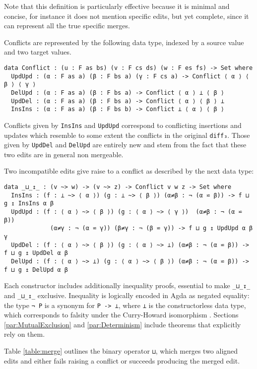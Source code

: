 \documentclass[../Thesis.tex]{subfiles}
\begin{document}
	Note that this definition is particularly effective because it is 
	minimal and concise, for instance it does not mention specific
	edits, but yet complete, since it can represent all the true specific merges.

	Conflicts are represented by the following data type, indexed by 
	a source value and two target values.

\begin{verbatim}	
data Conflict : (u : F as bs) (v : F cs ds) (w : F es fs) -> Set where
  UpdUpd : (α : F as a) (β : F bs a) (γ : F cs a) -> Conflict ⟨ α ⟩ ⟨ β ⟩ ⟨ γ ⟩
  DelUpd : (α : F as a) (β : F bs a) -> Conflict ⟨ α ⟩ ⊥ ⟨ β ⟩
  UpdDel : (α : F as a) (β : F bs a) -> Conflict ⟨ α ⟩ ⟨ β ⟩ ⊥ 
  InsIns : (α : F as a) (β : F bs b) -> Conflict ⊥ ⟨ α ⟩ ⟨ β ⟩
\end{verbatim}
	
	Conflicts given by \texttt{InsIns} and \texttt{UpdUpd}	 correspond to 
	conflicting insertions and updates which resemble to some extent the
	conflicts in the original \texttt{diff₃}. Those given by \texttt{UpdDel} and 
	\texttt{DelUpd} are entirely new and stem from the fact that these two
	edits are in general non mergeable.
	
	Two incompatible edits give raise to a conflict as described by the
	next data type:
	
\begin{verbatim}
data _⊔_↥_ : (v ~> w) -> (v ~> z) -> Conflict v w z -> Set where
  InsIns : (f : ⊥ ~> ⟨ α ⟩) (g : ⊥ ~> ⟨ β ⟩) (α≠β : ¬ (α ⋍ β)) -> f ⊔ g ↥ InsIns α β
  UpdUpd : (f : ⟨ α ⟩ ~> ⟨ β ⟩) (g : ⟨ α ⟩ ~> ⟨ γ ⟩)  (α≠β : ¬ (α ⋍ β)) 
             (α≠γ : ¬ (α ⋍ γ)) (β≠γ : ¬ (β ⋍ γ)) -> f ⊔ g ↥ UpdUpd α β γ
  UpdDel : (f : ⟨ α ⟩ ~> ⟨ β ⟩) (g : ⟨ α ⟩ ~> ⊥) (α≠β : ¬ (α ⋍ β)) -> f ⊔ g ↥ UpdDel α β
  DelUpd : (f : ⟨ α ⟩ ~> ⊥) (g : ⟨ α ⟩ ~> ⟨ β ⟩) (α≠β : ¬ (α ⋍ β)) -> f ⊔ g ↥ DelUpd α β
\end{verbatim}
	
	Each constructor includes additionally inequality proofs, essential 
	to make \texttt{\_⊔\_↧\_} and \texttt{\_⊔\_↥\_} exclusive.
	Inequality is logically encoded in Agda as negated equality: the type 
	\texttt{¬ P} is a synonym for \texttt{P -> ⊥}, where \texttt{⊥} is
	the constructorless data type, which corresponds to falsity 
	under the Curry-Howard isomorphism .
	Sections \ref{par:MutualExclusion} and \ref{par:Determinism} include
	theorems that explicitly rely on them.

	Table \ref{table:merge} outlines the binary operator \texttt{⊔}, which 
	merges two aligned edits and either fails raising a conflict or succeeds 
	producing the merged edit.
\end{document}
